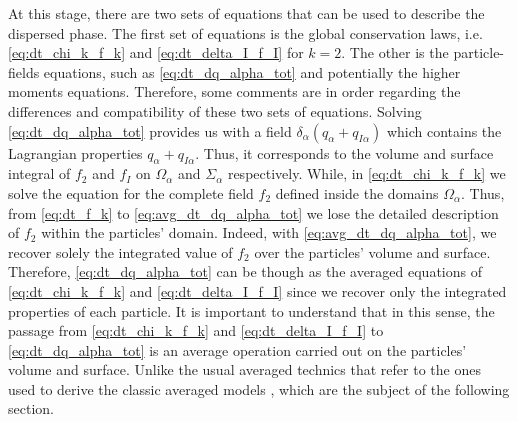 At this stage, there are two sets of equations that can be used to describe the dispersed phase. 
The first set of equations is the global conservation laws, i.e. \ref{eq:dt_chi_k_f_k} and \ref{eq:dt_delta_I_f_I} for $k=2$. 
The other is the particle-fields equations, such as \ref{eq:dt_dq_alpha_tot} and potentially the higher moments equations.
Therefore, some comments are in order regarding the differences and compatibility of these two sets of equations.
Solving \ref{eq:dt_dq_alpha_tot} provides us with a field $\delta_\alpha(q_\alpha+q_{I\alpha})$ which contains the Lagrangian properties $q_\alpha+q_{I\alpha}$.
Thus, it corresponds to the volume and surface integral of $f_2$ and $f_I$ on $\Omega_\alpha$ and $\Sigma_\alpha$ respectively.
While, in \ref{eq:dt_chi_k_f_k} we solve the equation for the complete field $f_2$ defined inside the domains $\Omega_\alpha$.  
Thus, from  \ref{eq:dt_f_k} to \ref{eq:avg_dt_dq_alpha_tot} we lose the detailed description of $f_2$ within the particles' domain.
Indeed, with \ref{eq:avg_dt_dq_alpha_tot}, we recover solely the integrated value of $f_2$ over the particles' volume and surface. 
Therefore, \ref{eq:dt_dq_alpha_tot} can be though as the averaged equations of \ref{eq:dt_chi_k_f_k} and \ref{eq:dt_delta_I_f_I} since we recover only the integrated properties of each particle. 
It is important to understand that in this sense, the passage from \ref{eq:dt_chi_k_f_k} and \ref{eq:dt_delta_I_f_I} to \ref{eq:dt_dq_alpha_tot} is an average operation carried out on the particles' volume and surface.
Unlike the usual averaged technics that refer to the ones used to derive the classic averaged models \citep{jackson1997locally,zhang1994averaged}, which are the subject of the following section. 



